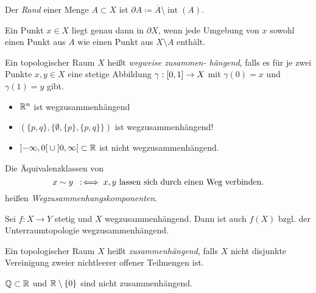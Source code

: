 \documentclass{cheat-sheet}
\newcommand{\inte}{\mathop{\mathrm{int}}} %
\begin{document}
\begin{defn}
  Der \emph{Rand} einer Menge $A \subset X$ ist $\partial A \coloneqq \overline{A} \setminus \inte(A)$.
\end{defn}

\begin{prop}
  Ein Punkt $x \in X$ liegt genau dann in $\partial X$, wenn jede Umgebung von $x$ sowohl einen Punkt aus $A$ wie einen Punkt aus $X \setminus A$ enthält.
\end{prop}



\begin{defn}
  Ein topologischer Raum $X$ heißt \emph{wegweise zusammen- hängend}, falls es für je zwei Punkte $x, y \in X$ eine stetige Abbildung $\gamma : \left[ 0, 1 \right] \to X$ mit $\gamma(0) = x$ und $\gamma(1) = y$ gibt.
\end{defn}

\begin{bspe}
  \begin{itemize}
    \item $\mathbb{R}^n$ ist wegzusammenhängend
    \item $(\{ p, q \}, \{ \emptyset, \{ p \}, \{ p, q \} \})$ ist wegzusammenhängend!
    \item $\left] -\infty, 0 \right[ \cup \left] 0, \infty \right[ \subset \mathbb{R}$ ist nicht wegzusammenhängend.
  \end{itemize}
\end{bspe}

\begin{defn}
  Die Äquivalenzklassen von
  \[ x \sim y \enspace:\!\iff x, y \text{ lassen sich durch einen Weg verbinden}. \]
  heißen \emph{Wegzusammenhangskomponenten}.
\end{defn}

\begin{prop}
  Sei $f : X \to Y$ stetig und $X$ wegzusammenhängend. Dann ist auch $f(X)$ bzgl. der Unterraumtopologie wegzusammenhängend.
\end{prop}

\begin{defn}
  Ein topologischer Raum $X$ heißt \emph{zusammenhängend}, falls $X$ nicht disjunkte Vereinigung zweier nichtleerer offener Teilmengen ist.
\end{defn}

\begin{bspe}
  $\mathbb{Q} \subset \mathbb{R}$ und $\mathbb{R} \setminus \{ 0 \}$ sind nicht zusammenhängend.
\end{bspe}
\end{document}
